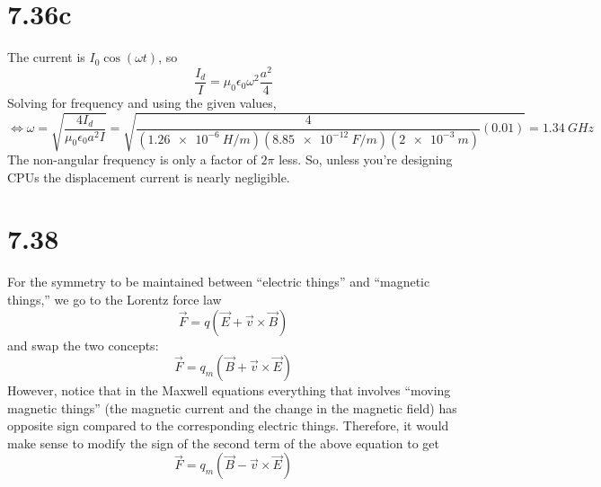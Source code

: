 \documentclass{article}
\begin{document}
\section*{7.36c}
The current is $I_0\cos(\omega t)$, so
\[\frac{I_d}{I}=\mu_0\epsilon_0\omega^2\frac{a^2}{4}\]
Solving for frequency and using the given values,
\[\Leftrightarrow \omega = \sqrt{\frac{4I_d}{\mu_0\epsilon_0 a^2I}}=\sqrt{\frac{4}{(\SI{1.26e-6}{H/m})(\SI{8.85e-12}{F/m})(\SI{2e-3}{m})}(0.01)}=\SI{1.34}{GHz}\]
The non-angular frequency is only a factor of $2\pi$ less. So, unless you're designing CPUs the displacement current is nearly negligible.

\section*{7.38}
For the symmetry to be maintained between ``electric things'' and ``magnetic things,'' we go to the Lorentz force law
\[\vec{F}=q\left( \vec{E}+\vec{v}\times\vec{B}\right)\]
and swap the two concepts:
\[\vec{F}=q_m\left( \vec{B}+\vec{v}\times\vec{E} \right)\]
However, notice that in the Maxwell equations everything that involves ``moving magnetic things'' (the magnetic current and the change in the magnetic field) has opposite sign compared to the corresponding electric things. Therefore, it would make sense to modify the sign of the second term of the above equation to get
\[\vec{F}=q_m\left( \vec{B}-\vec{v}\times \vec{E} \right)\]
\end{document}
